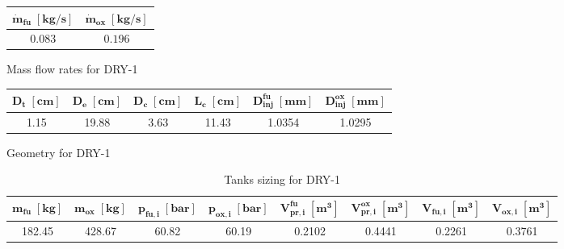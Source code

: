 \vspace*{8mm}

\begin{minipage}{0.35\linewidth}
    \centering
    \small
    \captionsetup{type=table}
    \renewcommand{\arraystretch}{1.4}
    \begin{tabular}{|c|c|}
        \hline
        $\boldsymbol{\dot{m}_{fu} \; [\textbf{kg/s}]}$  &
        $\boldsymbol{\dot{m}_{ox} \; [\textbf{kg/s}]}$  \\
        \hline
        \hline
        $0.083$ & $0.196$ \\
        \hline
    \end{tabular}
    \caption{Mass flow rates for DRY-1}
    \label{table:flow_rates_final}
\end{minipage}\hfill
\begin{minipage}{0.65\linewidth}
    \centering
    \small
    \captionsetup{type=table}
    \renewcommand{\arraystretch}{1.4}
    \begin{tabular}{|c|c|c|c|c|c|}
        \hline
        $\boldsymbol{D_t \; [\textbf{cm}]}$             &
        $\boldsymbol{D_e \; [\textbf{cm}]}$             &
        $\boldsymbol{D_c \; [\textbf{cm}]}$             &
        $\boldsymbol{L_c \; [\textbf{cm}]}$             &
        $\boldsymbol{D_{inj}^{fu} \; [\textbf{mm}]}$    &
        $\boldsymbol{D_{inj}^{ox} \; [\textbf{mm}]}$    \\
        \hline
        \hline
        1.15 & 19.88 & 3.63 & 11.43 & 1.0354 & 1.0295 \\
        \hline
    \end{tabular}
    \caption{Geometry for DRY-1}
    \label{table:geometry_final}
\end{minipage} 

\vspace*{6mm}

\begin{table}[H]
    \renewcommand{\arraystretch}{1.5}
    \centering
    \small
    \begin{tabular}{|c|c|c|c|c|c|c|c|}
        \hline
        $\boldsymbol{m_{fu} \; [\textbf{kg}]}$              &
        $\boldsymbol{m_{ox} \; [\textbf{kg}]}$              &
        $\boldsymbol{p_{fu,i} \; [\textbf{bar}]}$           &
        $\boldsymbol{p_{ox,i} \; [\textbf{bar}]}$           &
        $\boldsymbol{V_{pr, i}^{fu} \; [\textbf{m}^3]}$     &
        $\boldsymbol{V_{pr, i}^{ox} \; [\textbf{m}^3]}$     &
        $\boldsymbol{V_{fu, i} \; [\textbf{m}^3]}$          &
        $\boldsymbol{V_{ox, i} \; [\textbf{m}^3]}$          \\
        \hline
        \hline
        182.45 & 428.67 & 60.82 & 60.19 & 0.2102 & 0.4441 & 0.2261 & 0.3761 \\
        \hline
    \end{tabular}
    \caption{Tanks sizing for DRY-1}
    \label{table:tanks_final}
\end{table}

